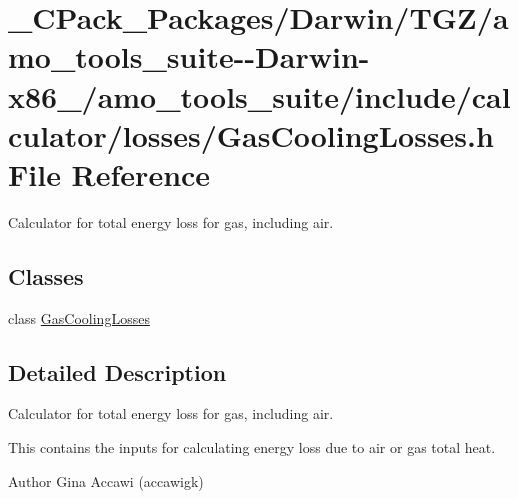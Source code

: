 \hypertarget{___c_pack___packages_2_darwin_2_t_g_z_2amo__tools__suite--_darwin-x86__64_2amo__tools__suite_2in0e2d3d228ff92cead438fc23253ea2ce}{}\section{\+\_\+\+C\+Pack\+\_\+\+Packages/\+Darwin/\+T\+G\+Z/amo\+\_\+tools\+\_\+suite-\/-\/\+Darwin-\/x86\+\_/amo\+\_\+tools\+\_\+suite/include/calculator/losses/\+Gas\+Cooling\+Losses.h File Reference}
\label{___c_pack___packages_2_darwin_2_t_g_z_2amo__tools__suite--_darwin-x86__64_2amo__tools__suite_2in0e2d3d228ff92cead438fc23253ea2ce}


Calculator for total energy loss for gas, including air.  


\subsection*{Classes}
\begin{DoxyCompactItemize}
\item 
class \hyperlink{class_gas_cooling_losses}{Gas\+Cooling\+Losses}
\end{DoxyCompactItemize}


\subsection{Detailed Description}
Calculator for total energy loss for gas, including air. 

This contains the inputs for calculating energy loss due to air or gas total heat.

\begin{DoxyAuthor}{Author}
Gina Accawi (accawigk) 
\end{DoxyAuthor}
